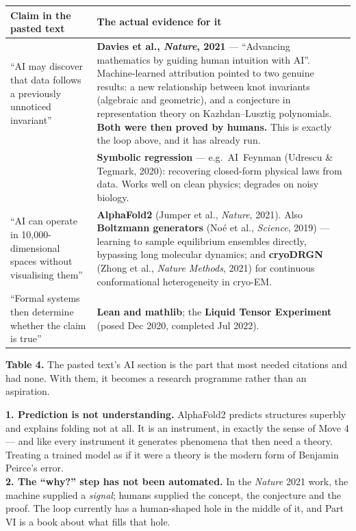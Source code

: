 \begin{center}\small
\begin{tabular}{@{}>{\raggedright\arraybackslash}p{4.3cm}>{\raggedright\arraybackslash}p{11.9cm}@{}}
\toprule
\rowcolor{ember!13}
\textbf{\color{ember}Claim in the pasted text} & \textbf{\color{ember}The actual evidence for it}\\
\midrule
``AI may discover that data follows a previously unnoticed invariant'' &
 \textbf{Davies et al., \textit{Nature}, 2021} --- ``Advancing mathematics by guiding human intuition
 with AI''. Machine-learned attribution pointed to two genuine results: a new relationship between
 knot invariants (algebraic and geometric), and a conjecture in representation theory on Kazhdan--Lusztig
 polynomials. \textbf{Both were then proved by humans.} This is exactly the loop above, and it has
 already run.\\
 & \textbf{Symbolic regression} --- e.g.\ AI~Feynman (Udrescu \& Tegmark, 2020): recovering closed-form
 physical laws from data. Works well on clean physics; degrades on noisy biology.\\
\addlinespace[2pt]
``AI can operate in 10{,}000-dimensional spaces without visualising them'' &
 \textbf{AlphaFold2} (Jumper et al., \textit{Nature}, 2021). Also \textbf{Boltzmann generators}
 (Noé et al., \textit{Science}, 2019) --- learning to sample equilibrium ensembles directly, bypassing
 long molecular dynamics; and \textbf{cryoDRGN} (Zhong et al., \textit{Nature Methods}, 2021) for
 continuous conformational heterogeneity in cryo-EM.\\
\addlinespace[2pt]
``Formal systems then determine whether the claim is true'' &
 \textbf{Lean and mathlib}; the \textbf{Liquid Tensor Experiment} (posed Dec 2020, completed Jul 2022).\\
\bottomrule
\end{tabular}
\end{center}
\vspace{-2pt}
\begin{center}\begin{minipage}{0.93\textwidth}\footnotesize\color{slate}
\textbf{Table 4.}\; The pasted text's AI section is the part that most needed citations and had none.
With them, it becomes a research programme rather than an aspiration.
\end{minipage}\end{center}

\begin{critbox}[title={Two cautions worth passing to your students}]
\textbf{1. Prediction is not understanding.} AlphaFold2 predicts structures superbly and explains
folding not at all. It is an instrument, in exactly the sense of Move 4 --- and like every instrument
it generates phenomena that then need a theory. Treating a trained model as if it were a theory is
the modern form of Benjamin Peirce's error.\\[5pt]
\textbf{2. The ``why?'' step has not been automated.} In the \textit{Nature} 2021 work, the machine
supplied a \emph{signal}; humans supplied the concept, the conjecture and the proof. The loop
currently has a human-shaped hole in the middle of it, and Part VI is a book about what fills that
hole.
\end{critbox}
